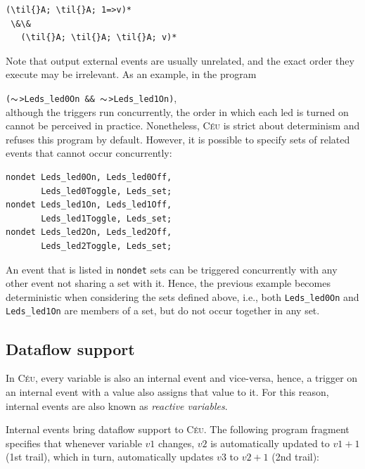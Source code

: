 \documentclass{sig-alternate-ipsn09}
\newcommand{\2}{\;\;}
\newcommand{\5}{\;\;\;\;\;}
\newcommand{\til}{$\thicksim$}
\newcommand{\CEU}{\textsc{C\'{e}u}}
\newcommand{\code}[1] {{\small{\texttt{#1}}}}
\begin{document}
\begin{Verbatim}[commandchars=\\\{\}]
   (\til{}A; \til{}A; 1=>v)*
 \&\&
   (\til{}A; \til{}A; \til{}A; v)*
\end{Verbatim}



Note that output external events are usually unrelated, and the exact order 
they execute may be irrelevant.
As an example, in the program

\code{(\til>Leds\_led0On~\&\&~\til>Leds\_led1On)},\\
although the triggers run concurrently, the order in which each led is turned 
on cannot be perceived in practice.
Nonetheless, \CEU{} is strict about determinism and refuses this program by 
default.
However, it is possible to specify sets of related events that cannot occur 
concurrently:

\begin{Verbatim}[commandchars=\\\{\}]
nondet Leds_led0On, Leds_led0Off,
       Leds_led0Toggle, Leds_set;
nondet Leds_led1On, Leds_led1Off,
       Leds_led1Toggle, Leds_set;
nondet Leds_led2On, Leds_led2Off,
       Leds_led2Toggle, Leds_set;
\end{Verbatim}

An event that is listed in \code{nondet} sets can be triggered concurrently 
with any other event not sharing a set with it.
Hence, the previous example becomes deterministic when considering the sets 
defined above, i.e., both \code{Leds\_led0On} and \code{Leds\_led1On} are 
members of a set, but do not occur together in any set.
\newline

\subsection{Dataflow support}
\label{sec:ceu:frp}

In \CEU{}, every variable is also an internal event and vice-versa, hence, a 
trigger on an internal event with a value also assigns that value to it.
For this reason, internal events are also known as \emph{reactive variables}.

Internal events bring dataflow support to \CEU.
The following program fragment specifies that whenever variable $v1$ changes, 
$v2$ is automatically updated to $v1+1$ (1st trail), which in turn, 
automatically updates $v3$ to $v2+1$ (2nd trail):
\end{document}

